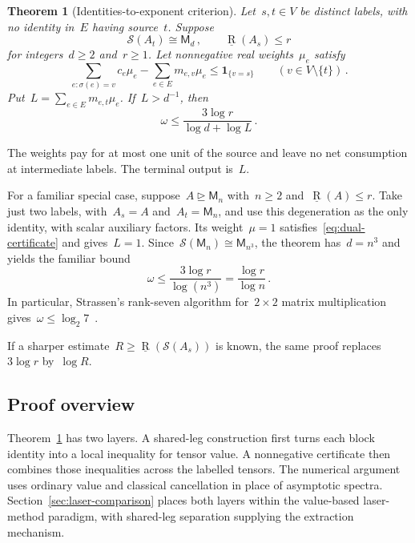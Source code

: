 \documentclass[11pt,letterpaper]{article}
\newtheorem{theorem}{Theorem}[section]
\theoremstyle{definition}
\numberwithin{equation}{section}
\newcommand{\MM}{\mathsf M}
\newcommand{\br}{\underline{\operatorname{R}}}
\newcommand{\degen}{\unrhd}
\begin{document}
\begin{theorem}[Identities-to-exponent criterion]\label{thm:potential}
Let~$s,t\in V$ be distinct labels, with no identity in~$E$ having source~$t$. Suppose
\begin{equation*}
 \mathcal S(A_t)\cong\MM_d\,,\qquad\br(A_s)\leq r
\end{equation*}
for integers~$d\geq2$ and~$r\geq1$. Let nonnegative real weights~$\mu_e$ satisfy
\begin{equation}\label{eq:dual-certificate}
 \sum_{e:\sigma(e)=v}c_e\mu_e-\sum_{e\in E}m_{e,v}\mu_e
 \leq\mathbf1_{\{v=s\}}\qquad(v\in V\setminus\{t\})\,.
\end{equation}
Put~$L=\sum_{e\in E}m_{e,t}\mu_e$. If~$L>d^{-1}$, then
\begin{equation}\label{eq:dual-exponent-bound}
 \omega\leq\frac{3\log r}{\log d+\log L}\,.
\end{equation}
\end{theorem}

The weights pay for at most one unit of the source and leave no net consumption at intermediate labels. The terminal output is~$L$.

For a familiar special case, suppose~$A\degen\MM_n$ with~$n\geq2$ and~$\br(A)\leq r$. Take just two labels, with~$A_s=A$ and~$A_t=\MM_n$, and use this degeneration as the only identity, with scalar auxiliary factors. Its weight~$\mu=1$ satisfies~\eqref{eq:dual-certificate} and gives~$L=1$. Since~$\mathcal S(\MM_n)\cong\MM_{n^3}$, the theorem has~$d=n^3$ and yields the familiar bound
\begin{equation*}
 \omega\leq\frac{3\log r}{\log(n^3)}=\frac{\log r}{\log n}\,.
\end{equation*}
In particular, Strassen's rank-seven algorithm for~$2\times2$ matrix multiplication gives~$\omega\leq\log_2 7$~\cite{Str69}.

If a sharper estimate~$R\geq\br(\mathcal S(A_s))$ is known, the same proof replaces~$3\log r$ by~$\log R$.

\subsection{Proof overview}\label{sec:proof-overview}

Theorem~\ref{thm:potential} has two layers. A shared-leg construction first turns each block identity into a local inequality for tensor value. A nonnegative certificate then combines those inequalities across the labelled tensors. The numerical argument uses ordinary value and classical cancellation in place of asymptotic spectra. Section~\ref{sec:laser-comparison} places both layers within the value-based laser-method paradigm, with shared-leg separation supplying the extraction mechanism.
\end{document}
